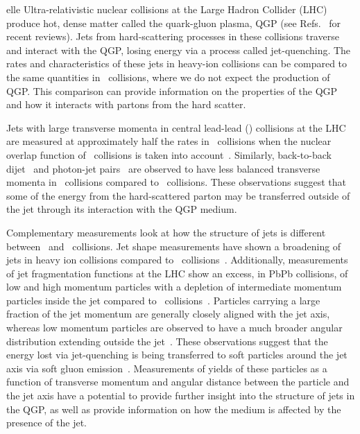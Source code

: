 
elle Ultra-relativistic nuclear collisions at the Large Hadron Collider (LHC) produce hot, dense matter called the quark-gluon plasma, QGP (see Refs.~\cite{Roland:2014jsa,Busza:2018rrf} for recent reviews).
Jets from hard-scattering processes in these collisions traverse and interact with the QGP, losing energy via a process called jet-quenching.
The rates and characteristics of these jets in heavy-ion collisions can be compared to the same quantities in \pp\ collisions, where we do not expect the production of QGP.
This comparison can provide information on the properties of the QGP and how it interacts with partons from the hard scatter.

Jets with large transverse momenta in central lead-lead (\pbpb) collisions at the LHC are measured at approximately half the rates in \pp\ collisions when the nuclear overlap function of \pbpb\ collisions is taken into account~\cite{Abelev:2013kqa,Aad:2014bxa,Adam:2015ewa,Khachatryan:2016jfl, 2019108}.
Similarly, back-to-back dijet~\cite{Aad:2010bu,Chatrchyan:2011sx,Aaboud:2017eww} and photon-jet pairs~\cite{Chatrchyan:2012gt,Aaboud:2018anc} are observed to have less balanced transverse momenta in \pbpb\ collisions compared to \pp\ collisions.
These observations suggest that some of the energy from the hard-scattered parton may be transferred outside of the jet through its interaction with the QGP medium.
 
Complementary measurements look at how the structure of jets is different between \pbpb\ and \pp\ collisions.
Jet shape measurements have shown a broadening of jets in heavy ion collisions compared to \pp\ collisions~\cite{Aad:2011sc, Acharya:2018uvf, Chatrchyan:2012mec, Chatrchyan:2013kwa}.
Additionally, measurements of jet fragmentation functions at the LHC show an excess, in PbPb collisions, of low and high momentum particles with a depletion of intermediate momentum particles inside the jet compared to \pp\ collisions~\cite{Aad:2014wha,Chatrchyan:2014ava,Aaboud:2017bzv,Aaboud:2018hpb}.
Particles carrying a large fraction of the jet momentum are generally closely aligned with the jet axis, whereas low momentum particles are observed to have a much broader angular distribution extending outside the jet~\cite{Chatrchyan:2011sx,Khachatryan:2015lha,Khachatryan:2016tfj,Sirunyan:2018jqr}.
These observations suggest that the energy lost via jet-quenching is being transferred to soft particles around the jet axis via soft gluon emission~\cite{Vitev:2008rz,Ovanesyan:2011xy,Blaizot:2014ula,Qin:2015srf,Escobedo:2016jbm,Casalderrey-Solana:2016jvj,Tachibana:2017syd}.
Measurements of yields of these particles as a function of transverse momentum and angular distance between the particle and the jet axis have a potential to provide further insight into the structure of jets in the QGP, as well as provide information on how the medium is affected by the presence of the jet.


